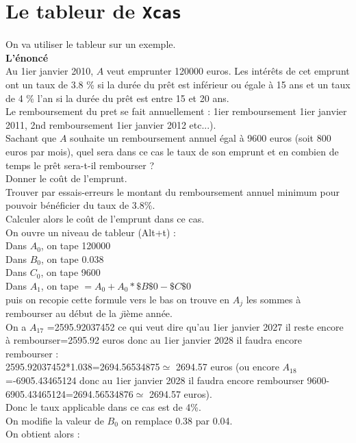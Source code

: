 \documentclass[a4paper,11pt]{book}
\begin{document}
\section{Le tableur de {\tt Xcas}}
On va utiliser le tableur sur un exemple.\\
{\bf L'\'enonc\'e}\\
Au 1ier janvier 2010, $A$ veut emprunter 120000 euros. Les int\'er\^ets de cet 
emprunt ont un taux de 3.8 \% si la dur\'ee du pr\^et est inf\'erieur ou 
\'egale \`a 15 ans et un taux de 4 \% l'an si la dur\'ee du pr\^et est entre 15
et 20 ans.\\ Le remboursement du pret se fait annuellement : 1ier remboursement
1ier janvier 2011, 2nd  remboursement 1ier janvier 2012 etc...).\\
Sachant que $A$ souhaite un remboursement annuel \'egal \`a 9600 euros (soit 800 euros par mois), quel sera dans ce cas le taux de son emprunt et en 
combien de temps le pr\^et sera-t-il rembourser ?\\
Donner le co\^ut de l'emprunt.\\
Trouver par essais-erreurs le montant du remboursement annuel minimum pour 
pouvoir b\'en\'eficier du taux de 3.8\%.\\
Calculer alors le co\^ut de l'emprunt dans ce cas.\\
On ouvre un niveau de tableur (Alt+t) :\\
Dans $A_0$, on tape 120000\\
Dans $B_0$, on tape 0.038\\
Dans $C_0$, on tape 9600\\
Dans $A_1$, on tape $=A_0+A_0*\$B\$0-\$C\$0$\\
puis on recopie cette formule vers le bas on trouve en $A_j$
les sommes \`a rembourser au d\'ebut de la $j$i\`eme ann\'ee.\\
On a  $A_{17}$ =2595.92037452 ce qui veut dire qu'au 1ier janvier 2027 il reste
encore \`a rembourser=2595.92 euros donc  au 1ier janvier 2028 il faudra
 encore rembourser :\\
2595.92037452*1.038=2694.56534875$\simeq$ 2694.57 euros (ou 
encore $A_{18}$ =-6905.43465124 donc au 1ier janvier 2028 il faudra
 encore rembourser 9600-6905.43465124=2694.56534876$\simeq$ 2694.57 euros).\\
Donc le taux applicable dans ce cas est de 4\%. \\
On modifie la valeur de $B_0$ on remplace 0.38 par 0.04.\\
On obtient alors :\\  
\end{document}
